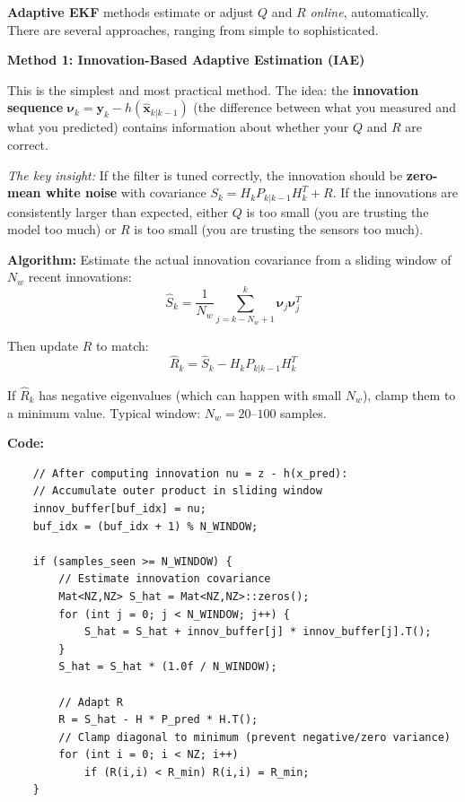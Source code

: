\textbf{Adaptive EKF} methods estimate or adjust $Q$ and $R$ \textit{online}, automatically. There are several approaches, ranging from simple to sophisticated.

\textbf{Method 1: Innovation-Based Adaptive Estimation (IAE)}

This is the simplest and most practical method. The idea: the \textbf{innovation sequence} $\boldsymbol{\nu}_k = \mathbf{y}_k - h(\hat{\mathbf{x}}_{k|k-1})$ (the difference between what you measured and what you predicted) contains information about whether your $Q$ and $R$ are correct.

\textit{The key insight:} If the filter is tuned correctly, the innovation should be \textbf{zero-mean white noise} with covariance $S_k = H_k P_{k|k-1} H_k^T + R$. If the innovations are consistently larger than expected, either $Q$ is too small (you are trusting the model too much) or $R$ is too small (you are trusting the sensors too much).

\textbf{Algorithm:} Estimate the actual innovation covariance from a sliding window of $N_w$ recent innovations:
\begin{equation}
\hat{S}_k = \frac{1}{N_w} \sum_{j=k-N_w+1}^{k} \boldsymbol{\nu}_j \boldsymbol{\nu}_j^T
\end{equation}

Then update $R$ to match:
\begin{equation}
\hat{R}_k = \hat{S}_k - H_k P_{k|k-1} H_k^T
\end{equation}

If $\hat{R}_k$ has negative eigenvalues (which can happen with small $N_w$), clamp them to a minimum value. Typical window: $N_w = 20$--$100$ samples.

\textbf{Code:}
\begin{verbatim}
    // After computing innovation nu = z - h(x_pred):
    // Accumulate outer product in sliding window
    innov_buffer[buf_idx] = nu;
    buf_idx = (buf_idx + 1) % N_WINDOW;

    if (samples_seen >= N_WINDOW) {
        // Estimate innovation covariance
        Mat<NZ,NZ> S_hat = Mat<NZ,NZ>::zeros();
        for (int j = 0; j < N_WINDOW; j++) {
            S_hat = S_hat + innov_buffer[j] * innov_buffer[j].T();
        }
        S_hat = S_hat * (1.0f / N_WINDOW);

        // Adapt R
        R = S_hat - H * P_pred * H.T();
        // Clamp diagonal to minimum (prevent negative/zero variance)
        for (int i = 0; i < NZ; i++)
            if (R(i,i) < R_min) R(i,i) = R_min;
    }
\end{verbatim}

